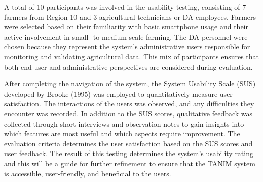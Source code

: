 {	A total of 10 participants was involved in the usability testing, consisting of 7 farmers from Region 10 and 3 agricultural technicians or DA employees. Farmers were selected based on their familiarity with basic smartphone usage and their active involvement in small- to medium-scale farming. The DA personnel were chosen because they represent the system’s administrative users responsible for monitoring and validating agricultural data. This mix of participants ensures that both end-user and administrative perspectives are considered during evaluation.
	
	After completing the navigation of the system, the System Usability Scale (SUS) developed by Brooke (1995) was employed to quantitatively measure user satisfaction. The interactions of the users was observed, and any difficulties they encounter was recorded. In addition to the SUS scores, qualitative feedback was collected through short interviews and observation notes to gain insights into which features are most useful and which aspects require improvement. The evaluation criteria determines the user satisfaction based on the SUS scores and user feedback. The result of this testing determines the system's usability rating and this will be a guide for further refinement to ensure that the TANIM system is accessible, user-friendly, and beneficial to the users.
	
}